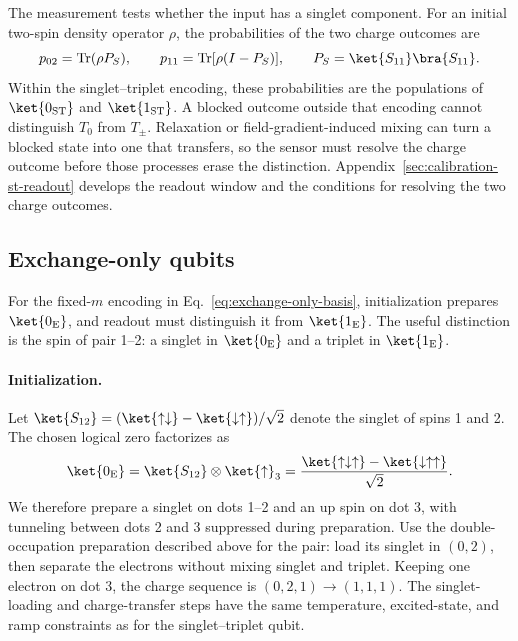 The measurement tests whether the input has a singlet component.
For an initial two-spin density operator $\rho$, the probabilities
of the two charge outcomes are
\begin{equation}
  p_{02}=\operatorname{Tr}(\rho P_S),\qquad
  p_{11}=\operatorname{Tr}[\rho(I-P_S)],\qquad
  P_S=\ket{S_{11}}\bra{S_{11}}.
  \label{eq:pauli-readout-probabilities}
\end{equation}
Within the singlet--triplet encoding, these probabilities are the
populations of $\ket{0_{\mathrm{ST}}}$ and $\ket{1_{\mathrm{ST}}}$.
A blocked outcome outside that encoding cannot distinguish $T_0$
from $T_\pm$. Relaxation or field-gradient-induced mixing can turn
a blocked state into one that transfers, so the sensor must resolve
the charge outcome before those processes erase the distinction.
Appendix~\ref{sec:calibration-st-readout} develops the readout
window and the conditions for resolving the two charge outcomes.


\subsection{Exchange-only qubits}
\label{sec:exchange-only-spam}

For the fixed-$m$ encoding in Eq.~\eqref{eq:exchange-only-basis},
initialization prepares $\ket{0_{\mathrm E}}$, and readout must
distinguish it from $\ket{1_{\mathrm E}}$.
The useful distinction is the spin of pair 1--2: a singlet in
$\ket{0_{\mathrm E}}$ and a triplet in $\ket{1_{\mathrm E}}$.

\paragraph{Initialization.}
Let $\ket{S_{12}}=(\ket{\uparrow\downarrow}
-\ket{\downarrow\uparrow})/\sqrt2$ denote the singlet of spins 1 and 2.
The chosen logical zero factorizes as
\begin{equation}
  \ket{0_{\mathrm E}}
    =\ket{S_{12}}\otimes\ket{\uparrow}_3
    =\frac{\ket{\uparrow\downarrow\uparrow}
                  -\ket{\downarrow\uparrow\uparrow}}{\sqrt2}.
  \label{eq:eo-initial-state}
\end{equation}
We therefore prepare a singlet on dots 1--2 and an up spin on dot 3,
with tunneling between dots 2 and 3 suppressed during preparation.
Use the double-occupation preparation described above for the pair:
load its singlet in $(0,2)$, then separate the electrons without
mixing singlet and triplet. Keeping one electron on dot 3, the
charge sequence is $(0,2,1)\to(1,1,1)$.
The singlet-loading and charge-transfer steps have the same
temperature, excited-state, and ramp constraints as for the
singlet--triplet qubit.

